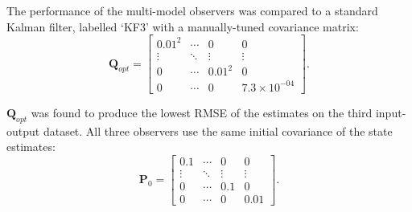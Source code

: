 The performance of the multi-model observers was compared to a standard Kalman filter, labelled `KF3' with a manually-tuned covariance matrix:
\begin{equation} \label{eq:Q_opt}
	\mathbf{Q}_{opt}=\begin{bmatrix}
		0.01^2 & \cdots & 0 & 0 \\
		\vdots & \ddots & \vdots & \vdots \\
		0 & \cdots & 0.01^2 & 0 \\
		0 & \cdots & 0 & 7.3\times10^{-04}
	\end{bmatrix}.
\end{equation}

$\mathbf{Q}_{opt}$ was found to produce the lowest RMSE of the estimates on the third input-output dataset. All three observers use the same initial covariance of the state estimates:
\begin{equation} \label{eq:P0}
	\mathbf{P}_0=\begin{bmatrix}
		0.1 & \cdots & 0 & 0 \\
		\vdots & \ddots & \vdots & \vdots \\
		0 & \cdots & 0.1 & 0 \\
		0 & \cdots & 0 & 0.01
	\end{bmatrix}.
\end{equation}


